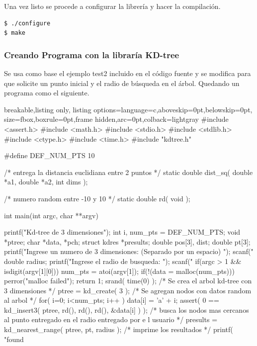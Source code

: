 \documentclass[12pt]{article}
\begin{document}
Una vez listo se procede a configurar la librería y hacer la compilación.
\begin{lstlisting}[frame=single]
$ ./configure
$ make
\end{lstlisting}

\subsubsection{Creando Programa con la libraría KD-tree}

Se usa como base el ejemplo test2 incluido en el código fuente y se modifica para que solicite un punto inicial y el radio de búsqueda en el árbol. Quedando un programa como el siguiente.

\begin{tcblisting}{breakable,listing only,
  listing options={language=c,aboveskip=0pt,belowskip=0pt},
  size=fbox,boxrule=0pt,frame hidden,arc=0pt,colback=lightgray}
#include <assert.h>
#include <math.h>
#include <stdio.h>
#include <stdlib.h>
#include <ctype.h>
#include <time.h>
#include "kdtree.h"

#define DEF_NUM_PTS 10

/* entrega la distancia euclidiana entre 2 puntos */
static double dist_sq( double *a1, double *a2, int dims );

/* numero random entre -10 y 10 */
static double rd( void );

int main(int argc, char **argv) {
  printf("Kd-tree de 3 dimensiones\n");
  int i, num_pts = DEF_NUM_PTS;
  void *ptree;
  char *data, *pch;
  struct kdres *presults;
  double pos[3], dist;
  double pt[3];
  printf("Ingrese un numero de 3 dimensiones: (Separado por un espacio) ");
  scanf("%
  double radius;
  printf("Ingrese el radio de busqueda: ");
  scanf("%
  if(argc > 1 && isdigit(argv[1][0])) {
    num_pts = atoi(argv[1]);
  }
  if(!(data = malloc(num_pts))) {
    perror("malloc failed");
    return 1;
  }
  srand( time(0) );
  /* Se crea el arbol kd-tree con 3 dimensiones */
  ptree = kd_create( 3 );
  /* Se agregan nodos con datos random al arbol */
  for( i=0; i<num_pts; i++ ) {
    data[i] = 'a' + i;
    assert( 0 == kd_insert3( ptree, rd(), rd(), rd(), &data[i] ) );
  }
  /* busca los nodos mas cercanos al punto entregado en el radio entregado por e                                                                                                                            l usuario */
  presults = kd_nearest_range( ptree, pt, radius );
  /* imprime los resultados */
  printf( "found %

}
\end{tcblisting}
\end{document}

